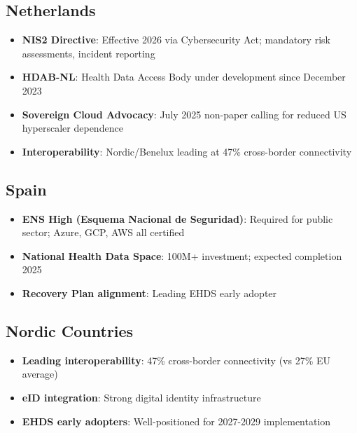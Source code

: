 \documentclass[11pt,a4paper]{article}
\begin{document}
\subsection{Netherlands}

\begin{itemize}
    \item \textbf{NIS2 Directive}: Effective 2026 via Cybersecurity Act; mandatory risk assessments, incident reporting
    \item \textbf{HDAB-NL}: Health Data Access Body under development since December 2023
    \item \textbf{Sovereign Cloud Advocacy}: July 2025 non-paper calling for reduced US hyperscaler dependence
    \item \textbf{Interoperability}: Nordic/Benelux leading at 47\% cross-border connectivity
\end{itemize}

\subsection{Spain}

\begin{itemize}
    \item \textbf{ENS High (Esquema Nacional de Seguridad)}: Required for public sector; Azure, GCP, AWS all certified
    \item \textbf{National Health Data Space}: \texteuro100M+ investment; expected completion 2025
    \item \textbf{Recovery Plan alignment}: Leading EHDS early adopter
\end{itemize}

\subsection{Nordic Countries}

\begin{itemize}
    \item \textbf{Leading interoperability}: 47\% cross-border connectivity (vs 27\% EU average)
    \item \textbf{eID integration}: Strong digital identity infrastructure
    \item \textbf{EHDS early adopters}: Well-positioned for 2027-2029 implementation
\end{itemize}

\end{document}
